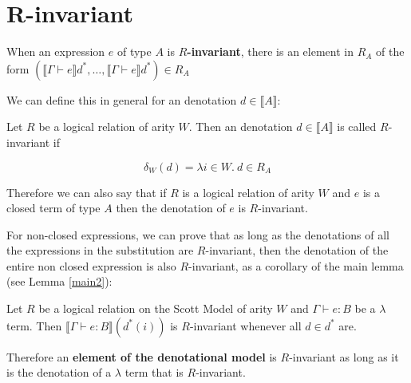 \section{R-invariant}

When an expression $e$ of type $A$ is \textbf{$R$-invariant}, there is an element in $R_A$ of the form $(\llbracket \Gamma \vdash e \rrbracket d^*, \dots , \llbracket \Gamma \vdash e \rrbracket d^*) \in R_A$

We can define this in general for an denotation $d \in \llbracket A \rrbracket$:

\vspace{0.5cm}

\begin{defn}
Let $R$ be a logical relation of arity $W$. Then an denotation $d \in \llbracket A \rrbracket$ is called $R$-invariant if 

\[\delta_W(d) = \lambda i \in W. \ d \in R_A \]
\end{defn}

Therefore we can also say that if $R$ is a logical relation of arity $W$ and $e$ is a closed term of type $A$ then the denotation of $e$ is $R$-invariant.

For non-closed expressions, we can prove that as long as the denotations of all the expressions in the substitution are $R$-invariant, then the denotation of the entire non closed expression is also $R$-invariant, as a corollary of the main lemma (see Lemma \ref{main2}):

\vspace{0.5cm}

\begin{cor}{\citep{Streicher06}}
Let $R$ be a logical relation on the Scott Model of arity $W$ and $\Gamma \vdash e : B$ be a $\lambda$ term. Then $\llbracket \Gamma \vdash e : B \rrbracket(d^*(i))$ is $R$-invariant whenever all $d \in d^*$ are.
\end{cor}



Therefore an \textbf{element of the denotational model} is $R$-invariant as long as it is the denotation of a $\lambda$ term that is $R$-invariant.

